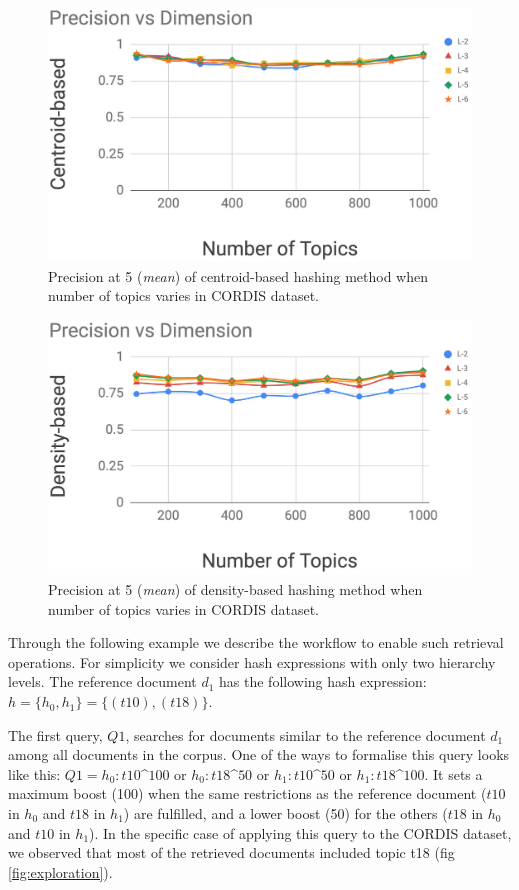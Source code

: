 \begin{figure}[t]\centering
\includegraphics[scale=0.25]{chhm-pd.png}
\caption{Precision at 5 (\textit{mean}) of centroid-based hashing method when number of topics varies in CORDIS dataset.}
\label{fig:chhm_pd}
\end{figure}


\begin{figure}[t]\centering
\includegraphics[scale=0.25]{dhhm-pd.png}
\caption{Precision at 5 (\textit{mean}) of density-based hashing method when number of topics varies in CORDIS dataset.}
\label{fig:dhhm_pd}
\end{figure}

Through the following example we describe the workflow to enable such retrieval operations. For simplicity we consider hash expressions with only two hierarchy levels. The reference document $d_1$ has the following hash expression: $h=\{h_0,h_1\}=\{(t10),(t18)\}$.

The first query, $Q1$, searches for documents similar to the reference document $d_1$ among all documents in the corpus. One of the ways to formalise this query looks like this: $Q1=h_0:t10$\^{}$100$ or $h_0:t18$\^{}$50$ or $h_1:t10$\^{}$50$ or $h_1:t18$\^{}$100$.  It sets a maximum boost (100) when the same restrictions as the reference document ($t10$ in $h_0$ and $t18$ in $h_1$) are fulfilled, and a lower boost (50) for the others ($t18$ in $h_0$ and $t10$ in $h_1$). In the specific case of applying this query to the CORDIS dataset, we observed that most of the retrieved documents included topic t18 (fig \ref{fig:exploration}).


